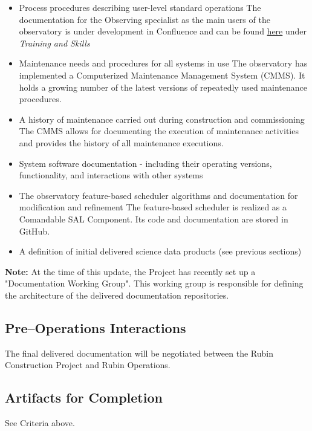 \begin{itemize}
	\item Process procedures describing user-level standard operations
	The documentation for the Observing specialist as the main users of the observatory is under development in Confluence and can be found \href{https://rubinobs.atlassian.net/wiki/spaces/OST/overview}{here} under \it{Training and Skills}

	\item Maintenance needs and procedures for all systems in use
	The observatory has implemented a Computerized Maintenance Management System (CMMS).
	It holds a growing number of the latest versions of repeatedly used maintenance procedures.

	\item A history of maintenance carried out during construction and commissioning
	The CMMS allows for documenting the execution of maintenance activities and provides the history of all maintenance executions.

	\item System software documentation - including their operating versions, functionality, and interactions with other systems

	\item The observatory feature-based scheduler algorithms and documentation for modification and refinement
	The feature-based scheduler is realized as a Comandable SAL Component. Its code and documentation are stored in GitHub.

	\item A definition of initial delivered science data products (see previous sections)
\end{itemize}

{\bf Note:} At the time of this update, the Project has recently set up a "Documentation Working Group".  This working group is responsible for defining the architecture of the delivered documentation repositories.

\subsection{Pre--Operations Interactions}

The final delivered documentation will be negotiated between the Rubin Construction Project and Rubin Operations.

\subsection{Artifacts for Completion}

See Criteria above.
